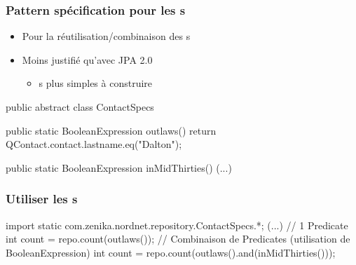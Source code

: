 \begin{frame}[fragile]
 \frametitle{Pattern spécification pour les s}

 \begin{itemize}
  \item Pour la réutilisation/combinaison des s
  \item Moins justifié qu'avec JPA 2.0
  \begin{itemize}
   \item {}s plus simples à construire
  \end{itemize}
 \end{itemize}

\begin{javacode}
public abstract class ContactSpecs {

  public static BooleanExpression outlaws() {
    return QContact.contact.lastname.eq("Dalton");
  }

  public static BooleanExpression inMidThirties() { (...) }

}
\end{javacode}

\end{frame}

\begin{frame}[fragile]
 \frametitle{Utiliser les s}

 \begin{javacode}
import static com.zenika.nordnet.repository.ContactSpecs.*;
(...)
// 1 Predicate
int count = repo.count(outlaws());
// Combinaison de Predicates (utilisation de BooleanExpression)
int count = repo.count(outlaws().and(inMidThirties()));
 \end{javacode}

\end{frame}